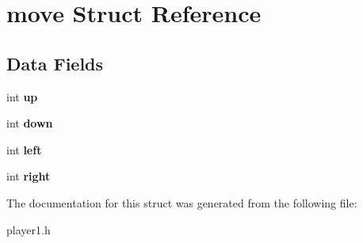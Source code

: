 \hypertarget{structmove}{}\section{move Struct Reference}
\label{structmove}
\subsection*{Data Fields}
\begin{DoxyCompactItemize}
\item 
int {\bfseries up}\hypertarget{structmove_a2a76268cfeddb10f02130688d1085a12}{}\label{structmove_a2a76268cfeddb10f02130688d1085a12}

\item 
int {\bfseries down}\hypertarget{structmove_a28f873b4bf37251d4e7976f1f70c31f5}{}\label{structmove_a28f873b4bf37251d4e7976f1f70c31f5}

\item 
int {\bfseries left}\hypertarget{structmove_ac5f55bad08778d301dee4330615c2283}{}\label{structmove_ac5f55bad08778d301dee4330615c2283}

\item 
int {\bfseries right}\hypertarget{structmove_aca01ce5fef7e69c470904188e1e4f322}{}\label{structmove_aca01ce5fef7e69c470904188e1e4f322}

\end{DoxyCompactItemize}


The documentation for this struct was generated from the following file\+:\begin{DoxyCompactItemize}
\item 
player1.\+h\end{DoxyCompactItemize}
